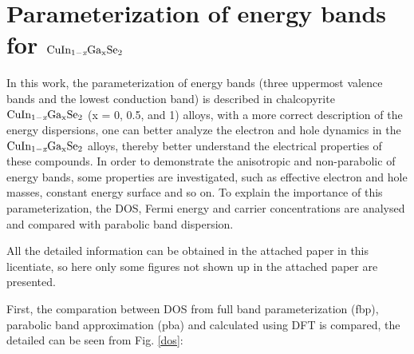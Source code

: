\documentclass[a4paper, 12pt, titlepage,oneside,drop]{kthesis}
\begin{document}
\section{Parameterization of energy bands for $\mathrm { CuIn_{1-\textit{x}}Ga_{x}Se_2}$}
In this work, the parameterization of energy bands (three uppermost valence bands and the lowest conduction band) is described in chalcopyrite $\mathrm { CuIn_{1-\textit{x}}Ga_{x}Se_2}$ 
(x = 0, 0.5, and 1) alloys, with a more correct description of the energy dispersions, one can better analyze the electron and hole dynamics in the $\mathrm { CuIn_{1-\textit{x}}Ga_{x}Se_2}$ alloys,
thereby better understand the electrical properties of these compounds. In order to demonstrate the anisotropic and non-parabolic of energy bands, some properties are investigated, such as effective 
electron and hole masses, constant energy surface and so on. To explain the importance of this parameterization, the DOS, Fermi energy and carrier
concentrations are analysed and compared with parabolic band dispersion.

All the detailed information can be obtained in the attached paper in this licentiate, so here only some figures not shown up in the attached paper are presented. 

First, the comparation between DOS from full band parameterization (fbp), parabolic band approximation (pba) and calculated using DFT is compared, the detailed can be seen from Fig. \ref{dos}:
\end{document}
